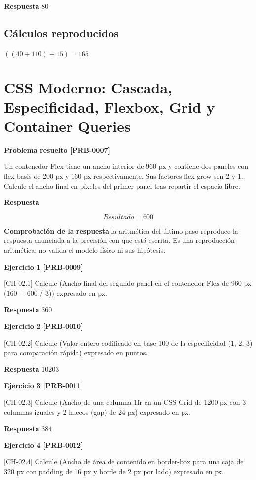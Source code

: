 \documentclass{book}
\begin{document}
\noindent\textbf{Respuesta} 80

\subsection*{Cálculos reproducidos}

\(\left(\left(40+110\right)+15\right) = 165\)

\section{CSS Moderno: Cascada, Especificidad, Flexbox, Grid y Container Queries}

\noindent\textbf{Problema resuelto [PRB-0007]}

Un contenedor Flex tiene un ancho interior de 960 px y contiene dos paneles con flex-basis de 200 px y 160 px respectivamente. Sus factores flex-grow son 2 y 1. Calcule el ancho final en píxeles del primer panel tras repartir el espacio libre.

\noindent\textbf{Respuesta}

\[
Resultado = 600
\]

\noindent\textbf{Comprobación de la respuesta} la aritmética del último paso reproduce la respuesta enunciada a la precisión con que está escrita. Es una reproducción aritmética; no valida el modelo físico ni sus hipótesis.

\noindent\textbf{Ejercicio 1 [PRB-0009]}

[CH-02.1] Calcule (Ancho final del segundo panel en el contenedor Flex de 960 px (160 + 600 / 3)) expresado en px.

\noindent\textbf{Respuesta} 360

\noindent\textbf{Ejercicio 2 [PRB-0010]}

[CH-02.2] Calcule (Valor entero codificado en base 100 de la especificidad (1, 2, 3) para comparación rápida) expresado en puntos.

\noindent\textbf{Respuesta} 10203

\noindent\textbf{Ejercicio 3 [PRB-0011]}

[CH-02.3] Calcule (Ancho de una columna 1fr en un CSS Grid de 1200 px con 3 columnas iguales y 2 huecos (gap) de 24 px) expresado en px.

\noindent\textbf{Respuesta} 384

\noindent\textbf{Ejercicio 4 [PRB-0012]}

[CH-02.4] Calcule (Ancho de área de contenido en border-box para una caja de 320 px con padding de 16 px y borde de 2 px por lado) expresado en px.
\end{document}
